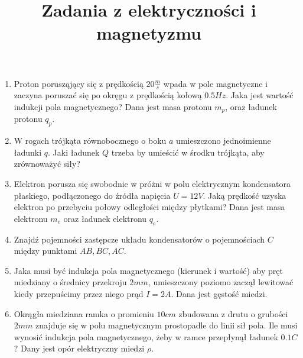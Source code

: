 \documentclass{../notatki}
\title{Zadania z elektryczności i magnetyzmu}
\begin{document}
\begin{enumerate}
  \item Proton porusząjący się z prędkością $20 \frac{m}{s}$ wpada w
    pole magnetyczne i zaczyna poruszać się po okręgu z prędkością
    kołową $0.5 Hz$. Jaka jest wartość indukcji pola magnetycznego?
    Dana jest masa protonu $m_p$, oraz ładunek protonu $q_p$.
  \item W rogach trójkąta równobocznego o boku $a$ umieszczono
    jednoimienne ładunki $q$. Jaki ładunek $Q$ trzeba by umieścić w
    środku trójkąta, aby zrównoważyć siły?
  \item Elektron porusza się swobodnie w próżni w polu elektrycznym
    kondensatora płaskiego, podłączonego do źródła napięcia $U =
    12V$. Jaką prędkość uzyska elektron po przebyciu połowy
    odległości między płytkami? Dana jest masa elektronu $m_e$ oraz
    ładunek elektronu $q_e$.
  \item Znajdź pojemności zastępcze układu kondensatorów o pojemnościach $C$
    między punktami $AB, BC, AC$.
    \begin{figure*}[h]
      \centering
    \end{figure*}

  \item Jaka musi być indukcja pola magnetycznego (kierunek i wartość) aby pręt
    miedziany o średnicy przekroju $2 mm$, umieszczony poziomo zaczął lewitować
    kiedy przepuścimy przez niego prąd $I = 2A$. Dana jest gęstość
    miedzi.
  \item Okrągła miedziana ramka o promieniu $10 cm$ zbudowana z drutu o grubości
    $2 mm$ znajduje się w polu magnetycznym prostopadle do linii sił
    pola. Ile musi
    wynosić indukcja pola magnetycznego, żeby w ramce przepłynął
    ładunek $0.1 C$? Dany jest opór elektryczny miedzi $\rho$.
\end{enumerate}
\end{document}
